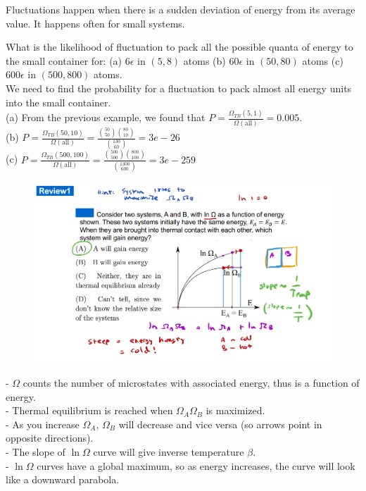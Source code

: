 \documentclass[12pt, a4paper]{article}
\newcounter{exa}
\begin{document}
Fluctuations happen when there is a sudden deviation of energy from its average value. It happens often for small systems. \\

\begin{texample}
What is the likelihood of fluctuation to pack all the possible quanta of energy to the small container for: (a) $6\epsilon$ in $(5,8)$ atoms (b) $60\epsilon$ in $(50,80)$ atoms (c) $600\epsilon$ in $(500,800)$ atoms. \\

We need to find the probability for a fluctuation to pack almost all energy units into the small container. \\

(a) From the previous example, we found that $P=\frac{\Omega_{TB} (5,1)}{\Omega (\text{all})}=0.005$. \\

(b) $P=\frac{\Omega_{TB} (50,10)}{\Omega (\text{all})}=\frac{\binom{50}{50}\binom{80}{10}}{\binom{130}{60}}=3e-26$ \\

(c) $P=\frac{\Omega_{TB} (500,100)}{\Omega (\text{all})}=\frac{\binom{500}{500}\binom{800}{100}}{\binom{1300}{600}}=3e-259$
\end{texample}

\begin{texample}
\begin{figure}[H]
\centering
\includegraphics[width=120mm]{11.png}
\end{figure}

- $\Omega$ counts the number of microstates with associated energy, thus is a function of energy. \\

- Thermal equilibrium is reached when $\Omega_A\Omega_B$ is maximized. \\

- As you increase $\Omega_A$, $\Omega_B$ will decrease and vice versa (so arrows point in opposite directions). \\

- The slope of $\ln\Omega$ curve will give inverse temperature $\beta$. \\

- $\ln\Omega$ curves have a global maximum, so as energy increases, the curve will look like a downward parabola.
\end{texample}
\end{document}

